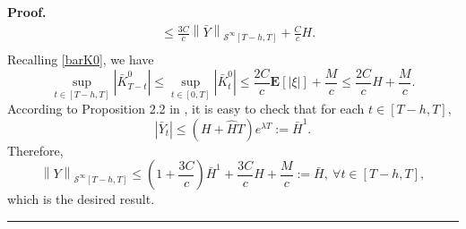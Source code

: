 \documentclass[10pt]{article}%
\numberwithin{equation}{section}
\newenvironment{proof}[1][Proof]{\noindent \textbf{#1.} }{\  \rule{0.5em}{0.5em}}
\begin{document}
\begin{proof}
$$\begin{aligned}
&\leq \frac{3C}{c}\left\|\bar{Y}\right\|_{\mathcal{S}^{\infty}[T-h, T]}+\frac{C}{c}H.\\  
\end{aligned}		
$$
Recalling \eqref{barK0}, we have
\begin{equation*}
 \sup_{t\in[T-h,T]}\left|\bar{K}^0_{T-t}\right|\leq \sup_{t\in[0,T]}\left|\bar{K}^0_{t}\right|\leq \frac{2C}{c}\mathbf{E}[\left|\xi\right|]+\frac{M}{c}\leq \frac{2C}{c}H+\frac{M}{c}.   
\end{equation*}
According to Proposition 2.2 in \cite{BE}, it is easy to check that for each $t\in[T-h,T]$,
$$\left|\bar{Y}_t\right|\leq(H+\hat{H}T)e^{\lambda T}:=\bar{H}^1.$$
Therefore,
\begin{equation}\label{barH}
\left\|Y\right\|_{\mathcal{S}^{\infty}[T-h,T]}\leq(1+\frac{3C}{c})\bar{H}^1+\frac{3C}{c}H+\frac{M}{c}:=\bar{H}, \ \forall t\in[T-h,T],   
\end{equation}
which is the desired result.
\end{proof}
\end{document}
